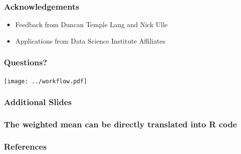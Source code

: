 \documentclass{beamer}
\begin{document}
\begin{frame}

    \frametitle{Acknowledgements}

\begin{itemize}
    \item Feedback from Duncan Temple Lang and Nick Ulle
    \item Applications from Data Science Institute Affiliates
\end{itemize}

\end{frame}
\begin{frame}

    \frametitle{Questions?}
    \centerline{\texttt{[image: ../workflow.pdf]}}

\end{frame}
\begin{frame}

    \frametitle{Additional Slides}

\end{frame}
\begin{frame}

    \frametitle{The weighted mean can be directly translated into R code}


\end{frame}
\begin{frame}
\frametitle{References}
\printbibliography
\end{frame}
\end{document}
